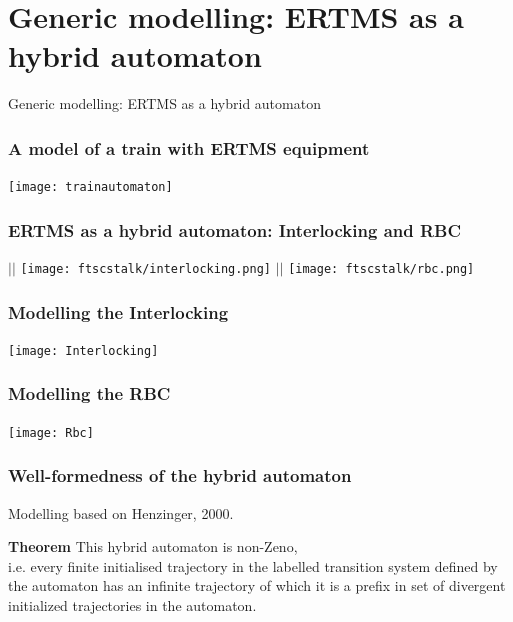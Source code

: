 \documentclass{beamer}
\begin{document}
\section{Generic modelling: ERTMS as a hybrid automaton}

\begin{frame}
\begin{center}
{\Large Generic modelling: ERTMS as a hybrid automaton}
\end{center}
\end{frame}




\begin{frame}
\frametitle{A model of a train with ERTMS equipment}
\begin{center}
\texttt{[image: trainautomaton]}
\end{center}
\end{frame}

\begin{frame}
\frametitle{ERTMS as a hybrid automaton: Interlocking and RBC}
\begin{center}
{\huge $ || $}
\texttt{[image: ftscstalk/interlocking.png]} {\huge $ || $}
\texttt{[image: ftscstalk/rbc.png]}
\end{center}
\end{frame}



\begin{frame}
\frametitle{Modelling the Interlocking}

\vspace*{-2cm}
\texttt{[image: Interlocking]}
\end{frame}



\begin{frame}
\frametitle{Modelling the RBC}
\vspace*{-3cm}
\begin{center}
\texttt{[image: Rbc]}
\end{center}
\end{frame}

\begin{frame}
\frametitle{Well-formedness of the hybrid automaton}

\bigskip

Modelling based on Henzinger, 2000.

\bigskip\bigskip

{\bf Theorem} This hybrid automaton is non-Zeno, \\ i.e. every finite
initialised trajectory in the labelled transition system defined by
the automaton has an infinite trajectory of which it is a prefix in
set of divergent initialized trajectories in the automaton.

\vfill

\end{frame}
\end{document}
